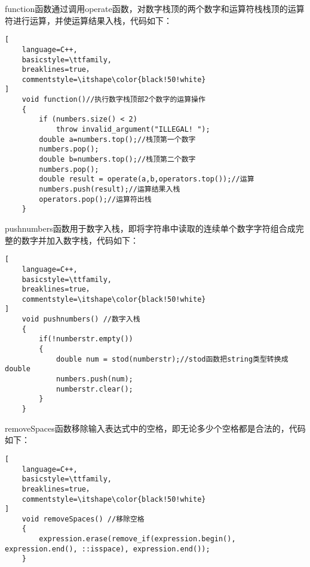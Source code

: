 \documentclass[UTF8]{ctexart}
\begin{document}
function函数通过调用operate函数，对数字栈顶的两个数字和运算符栈栈顶的运算符进行运算，并使运算结果入栈，代码如下：
\begin{lstlisting}[
    language=C++,
    basicstyle=\ttfamily,
    breaklines=true，
    commentstyle=\itshape\color{black!50!white}
]
    void function()//执行数字栈顶部2个数字的运算操作
    {
        if (numbers.size() < 2) 
            throw invalid_argument("ILLEGAL! ");
        double a=numbers.top();//栈顶第一个数字
        numbers.pop();
        double b=numbers.top();//栈顶第二个数字
        numbers.pop();
        double result = operate(a,b,operators.top());//运算
        numbers.push(result);//运算结果入栈
        operators.pop();//运算符出栈
    }
\end{lstlisting}

pushnumbers函数用于数字入栈，即将字符串中读取的连续单个数字字符组合成完整的数字并加入数字栈，代码如下：
\begin{lstlisting}[
    language=C++,
    basicstyle=\ttfamily,
    breaklines=true，
    commentstyle=\itshape\color{black!50!white}
]
    void pushnumbers() //数字入栈
    {
        if(!numberstr.empty())
        {
            double num = stod(numberstr);//stod函数把string类型转换成double
            numbers.push(num);
            numberstr.clear();
        }
    }
\end{lstlisting}

removeSpaces函数移除输入表达式中的空格，即无论多少个空格都是合法的，代码如下：
\begin{lstlisting}[
    language=C++,
    basicstyle=\ttfamily,
    breaklines=true，
    commentstyle=\itshape\color{black!50!white}
]
    void removeSpaces() //移除空格
    {
        expression.erase(remove_if(expression.begin(), expression.end(), ::isspace), expression.end());
    }
\end{lstlisting}
\end{document}
